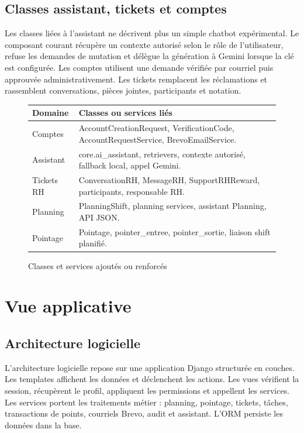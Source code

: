 \documentclass[12pt,a4paper]{report}
\begin{document}
\subsection{Classes assistant, tickets et comptes}
Les classes liées à l'assistant ne décrivent plus un simple chatbot expérimental. Le composant courant récupère un contexte autorisé selon le rôle de l'utilisateur, refuse les demandes de mutation et délègue la génération à Gemini lorsque la clé est configurée. Les comptes utilisent une demande vérifiée par courriel puis approuvée administrativement. Les tickets remplacent les réclamations et rassemblent conversations, pièces jointes, participants et notation.

\begin{figure}[H]
\centering
\renewcommand{\arraystretch}{1.2}
\begin{tabular}{|p{4cm}|p{9cm}|}
\hline
\textbf{Domaine} & \textbf{Classes ou services liés}\\ \hline
Comptes & AccountCreationRequest, VerificationCode, AccountRequestService, BrevoEmailService.\\ \hline
Assistant & core.ai\_assistant, retrievers, contexte autorisé, fallback local, appel Gemini.\\ \hline
Tickets RH & ConversationRH, MessageRH, SupportRHReward, participants, responsable RH.\\ \hline
Planning & PlanningShift, planning services, assistant Planning, API JSON.\\ \hline
Pointage & Pointage, pointer\_entree, pointer\_sortie, liaison shift planifié.\\ \hline
\end{tabular}
\caption{Classes et services ajoutés ou renforcés}
\label{fig:classes-renforcees}
\end{figure}

\section{Vue applicative}
\subsection{Architecture logicielle}
L'architecture logicielle repose sur une application Django structurée en couches. Les templates affichent les données et déclenchent les actions. Les vues vérifient la session, récupèrent le profil, appliquent les permissions et appellent les services. Les services portent les traitements métier : planning, pointage, tickets, tâches, transactions de points, courriels Brevo, audit et assistant. L'ORM persiste les données dans la base.
\end{document}

